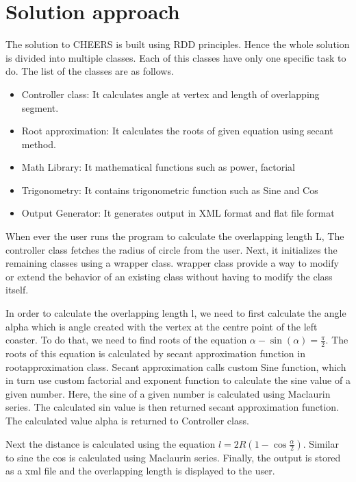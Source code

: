 \section{Solution approach}
\begin{flushleft}
The solution to CHEERS is built using RDD principles. Hence the whole solution is divided into multiple classes. Each of this classes have only one specific task to do. The list of the classes are as follows.
\begin{itemize}
  \item Controller class: It calculates angle at vertex and length of overlapping segment.
  \item Root approximation: It calculates the roots of given equation using secant method.
  \item Math Library: It mathematical functions such as power, factorial
  \item Trigonometry: It contains trigonometric function such as Sine and Cos
  \item Output Generator: It generates output in XML format and flat file format
\end{itemize}

When ever the user runs the  program to calculate the overlapping length L, The controller class fetches the radius of circle from the user. Next, it initializes the remaining classes using a wrapper class. wrapper class provide a way to modify or extend the behavior of an existing class without having to modify the class itself. 
\end{flushleft}
\begin{flushleft}
In order to calculate the overlapping length l, we need to first calculate the angle alpha which is angle created with the vertex at the centre point of the left coaster. To do that, we need to find roots of the equation $\alpha - \sin(\alpha) = \frac{\pi}{2}$. 
The roots of this equation is calculated by secant approximation function in rootapproximation class. Secant approximation calls custom Sine function, which in turn use custom factorial and exponent function to calculate the sine value of a given number. 
Here, the sine of a given number is calculated using Maclaurin series. The calculated sin value is then returned secant approximation function. 
The calculated value alpha is returned to Controller class.
\end{flushleft}
\begin{flushleft}
  Next the distance is calculated using the equation $l = 2R\left(1 - \cos\frac{\alpha}{2}\right)$. Similar to sine the cos is calculated using Maclaurin series. Finally, the output is stored as a xml file and the overlapping  length is displayed to the user.
\end{flushleft}
    \pagebreak

